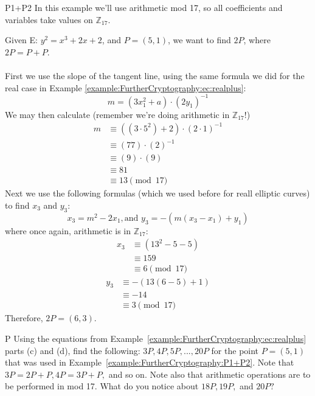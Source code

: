 \begin{example}{P1+P2} In this example we'll use arithmetic mod 17, so  all coefficients and variables take values on $\mathbb{Z}_{17}$.  

Given E: $y^2 = x^3 + 2x + 2$, and $P = (5,1)$,  we want to find $2P$, where $2P = P + P$.\\ \\
First we use the slope of the tangent line, using the same formula we did for the real case in Example \ref{example:FurtherCryptography:ec:realplus}:	
\[m = (3x_1^2 + a) \cdot (2y_1)^{-1}\]	
We may then calculate (remember we're doing arithmetic in  $\mathbb{Z}_{17}$!)
\begin{align*}
		m &\equiv ( (3 \cdot 5^2) + 2) \cdot (2 \cdot 1)^{-1} \\
	          &\equiv  (77) \cdot (2)^{-1} \\
                     &\equiv (9) \cdot (9)\\
                     &\equiv 81 \\
                    &\equiv 13 \pmod{17}
		\end{align*}
Next we use the following formulas (which we used before for reall elliptic curves) to find $x_3$ and $y_3$: \[ x_3 = m^2 - 2x_1  , \text{and~} y_3 =-(  m(x_3 - x_1)+y_1)\]
where once again, arithmetic is in $\mathbb{Z}_{17}$:
\begin{align*}
		x_3 &\equiv  (13^2 - 5 - 5 ) \\
	          &\equiv 159\\
                     &\equiv 6 \pmod{17}
		\end{align*}
			\begin{align*}
		y_3 &\equiv - (13(6 - 5) +1) \\
	          &\equiv -14\\
                     &\equiv 3 \pmod{17}
		\end{align*}
Therefore, $2P = (6,3)$.
\end{example}

\begin{exercise}{P}
Using the equations from Example~\ref{example:FurtherCryptography:ec:realplus} parts (c) and (d), find the following: $3P, 4P, 5P, ..., 20P$ for the point $P=(5,1)$ that was used in Example~\ref{example:FurtherCryptography:P1+P2}.  Note that $3P = 2P + P,  4P = 3P +P,$ and so on. Note also that arithmetic operations are to be performed in mod 17.  What do you notice about $18P,  19P,$ and $20P?$
\end{exercise}

